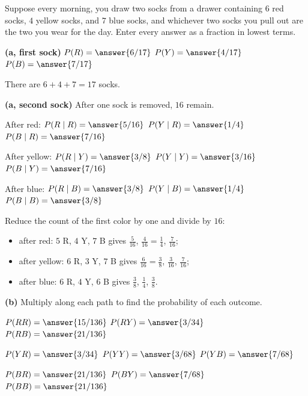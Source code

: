 \documentclass[12pt]{ximera}
\begin{document}
\begin{problem}
Suppose every morning, you draw two socks from a drawer containing $6$ red socks,
$4$ yellow socks, and $7$ blue socks, and whichever two socks you pull out are the two
you wear for the day. Enter every answer as a fraction in lowest terms.

\begin{prompt}
\textbf{(a, first sock)} $P(R)=\answer{6/17}$ \qquad $P(Y)=\answer{4/17}$ \qquad
$P(B)=\answer{7/17}$

\begin{feedback}
There are $6+4+7=17$ socks.
\end{feedback}
\end{prompt}

\begin{prompt}
\textbf{(a, second sock)} After one sock is removed, $16$ remain.

After red: \quad $P(R\mid R)=\answer{5/16}$ \quad $P(Y\mid R)=\answer{1/4}$ \quad
$P(B\mid R)=\answer{7/16}$

\smallskip
After yellow: \quad $P(R\mid Y)=\answer{3/8}$ \quad $P(Y\mid Y)=\answer{3/16}$ \quad
$P(B\mid Y)=\answer{7/16}$

\smallskip
After blue: \quad $P(R\mid B)=\answer{3/8}$ \quad $P(Y\mid B)=\answer{1/4}$ \quad
$P(B\mid B)=\answer{3/8}$

\begin{feedback}
Reduce the count of the first color by one and divide by $16$:
\begin{itemize}
\item after red: $5$ R, $4$ Y, $7$ B gives $\frac5{16}$, $\frac4{16}=\frac14$, $\frac7{16}$;
\item after yellow: $6$ R, $3$ Y, $7$ B gives $\frac6{16}=\frac38$, $\frac3{16}$, $\frac7{16}$;
\item after blue: $6$ R, $4$ Y, $6$ B gives $\frac38$, $\frac14$, $\frac38$.
\end{itemize}
\end{feedback}
\end{prompt}

\begin{prompt}
\textbf{(b)} Multiply along each path to find the probability of each outcome.

$P(RR)=\answer{15/136}$ \quad $P(RY)=\answer{3/34}$ \quad $P(RB)=\answer{21/136}$

\smallskip
$P(YR)=\answer{3/34}$ \quad $P(YY)=\answer{3/68}$ \quad $P(YB)=\answer{7/68}$

\smallskip
$P(BR)=\answer{21/136}$ \quad $P(BY)=\answer{7/68}$ \quad $P(BB)=\answer{21/136}$


\end{prompt}
\end{problem}
\end{document}

